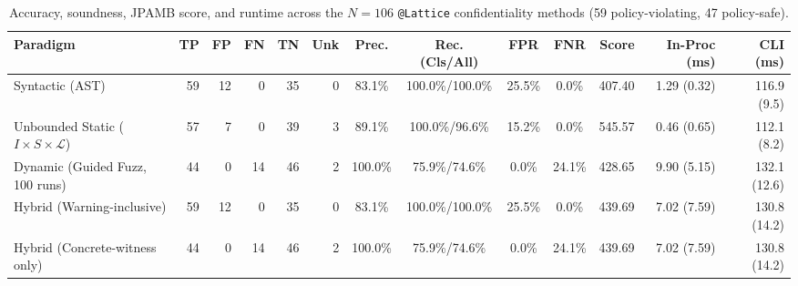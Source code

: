 \begin{table}[t]
\centering
\caption{Accuracy, soundness, JPAMB score, and runtime across the $N = 106$ \texttt{@Lattice} confidentiality methods (59 policy-violating, 47 policy-safe).}
\label{tab:rq1-paradigms}
\small
\begin{tabular}{lrrrrrccccrrr}
\toprule
Paradigm & TP & FP & FN & TN & Unk & Prec. & Rec. (Cls/All) & FPR & FNR & Score & In-Proc (ms) & CLI (ms) \\
\midrule
Syntactic (AST) & 59 & 12 & 0 & 35 & 0 & 83.1\% & 100.0\%/100.0\% & 25.5\% & 0.0\% & 407.40 & 1.29 (0.32) & 116.9 (9.5) \\
Unbounded Static ($I \times S \times \mathcal{L}$) & 57 & 7 & 0 & 39 & 3 & 89.1\% & 100.0\%/96.6\% & 15.2\% & 0.0\% & 545.57 & 0.46 (0.65) & 112.1 (8.2) \\
Dynamic (Guided Fuzz, 100 runs) & 44 & 0 & 14 & 46 & 2 & 100.0\% & 75.9\%/74.6\% & 0.0\% & 24.1\% & 428.65 & 9.90 (5.15) & 132.1 (12.6) \\
Hybrid (Warning-inclusive) & 59 & 12 & 0 & 35 & 0 & 83.1\% & 100.0\%/100.0\% & 25.5\% & 0.0\% & 439.69 & 7.02 (7.59) & 130.8 (14.2) \\
Hybrid (Concrete-witness only) & 44 & 0 & 14 & 46 & 2 & 100.0\% & 75.9\%/74.6\% & 0.0\% & 24.1\% & 439.69 & 7.02 (7.59) & 130.8 (14.2) \\
\bottomrule
\end{tabular}
\end{table}

